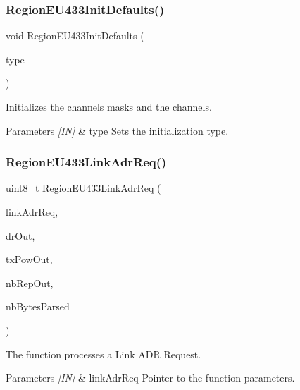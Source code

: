 \subsubsection{\texorpdfstring{Region\+E\+U433\+Init\+Defaults()}{RegionEU433InitDefaults()}}
{\footnotesize\ttfamily void Region\+E\+U433\+Init\+Defaults (\begin{DoxyParamCaption}\item[{\hyperlink{group__REGION_gaddc73ae10673ec925724e7870363bda9}{Init\+Type\+\_\+t}}]{type }\end{DoxyParamCaption})}



Initializes the channels masks and the channels. 


\begin{DoxyParams}{Parameters}
{\em \mbox{[}\+I\+N\mbox{]}} & type Sets the initialization type. \\
\hline
\end{DoxyParams}
\mbox{\label{group__REGIONEU433_gafd3e374d9048e67d54d1fa90b8d18723}} 
\subsubsection{\texorpdfstring{Region\+E\+U433\+Link\+Adr\+Req()}{RegionEU433LinkAdrReq()}}
{\footnotesize\ttfamily uint8\+\_\+t Region\+E\+U433\+Link\+Adr\+Req (\begin{DoxyParamCaption}\item[{\hyperlink{group__REGION_gad4af503e8d4de1846129e26a799a1e8e}{Link\+Adr\+Req\+Params\+\_\+t} $\ast$}]{link\+Adr\+Req,  }\item[{int8\+\_\+t $\ast$}]{dr\+Out,  }\item[{int8\+\_\+t $\ast$}]{tx\+Pow\+Out,  }\item[{uint8\+\_\+t $\ast$}]{nb\+Rep\+Out,  }\item[{uint8\+\_\+t $\ast$}]{nb\+Bytes\+Parsed }\end{DoxyParamCaption})}



The function processes a Link A\+DR Request. 


\begin{DoxyParams}{Parameters}
{\em \mbox{[}\+I\+N\mbox{]}} & link\+Adr\+Req Pointer to the function parameters.\\
\hline
\end{DoxyParams}

